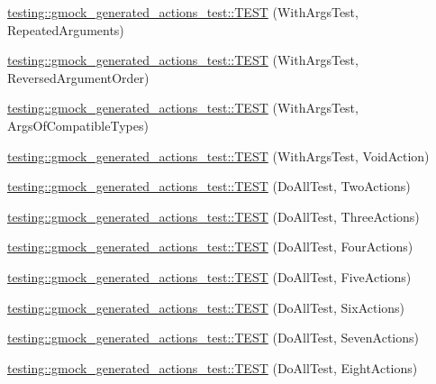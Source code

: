\begin{DoxyCompactItemize}
\item 
\hyperlink{namespacetesting_1_1gmock__generated__actions__test_aea7114a30b1fc589d14e84f1a27bd1fb}{testing\+::gmock\+\_\+generated\+\_\+actions\+\_\+test\+::\+T\+E\+ST} (With\+Args\+Test, Repeated\+Arguments)
\item 
\hyperlink{namespacetesting_1_1gmock__generated__actions__test_a8a9dc47b8e9810ca74166a9d17cba54f}{testing\+::gmock\+\_\+generated\+\_\+actions\+\_\+test\+::\+T\+E\+ST} (With\+Args\+Test, Reversed\+Argument\+Order)
\item 
\hyperlink{namespacetesting_1_1gmock__generated__actions__test_a4330224375c915f21860c30798dacd0c}{testing\+::gmock\+\_\+generated\+\_\+actions\+\_\+test\+::\+T\+E\+ST} (With\+Args\+Test, Args\+Of\+Compatible\+Types)
\item 
\hyperlink{namespacetesting_1_1gmock__generated__actions__test_a744fd048a745e3df48a578ed251003c6}{testing\+::gmock\+\_\+generated\+\_\+actions\+\_\+test\+::\+T\+E\+ST} (With\+Args\+Test, Void\+Action)
\item 
\hyperlink{namespacetesting_1_1gmock__generated__actions__test_ab1820fa999561582ae20885c4149a634}{testing\+::gmock\+\_\+generated\+\_\+actions\+\_\+test\+::\+T\+E\+ST} (Do\+All\+Test, Two\+Actions)
\item 
\hyperlink{namespacetesting_1_1gmock__generated__actions__test_a9fe00b82e3daa39501cefb4636b1909c}{testing\+::gmock\+\_\+generated\+\_\+actions\+\_\+test\+::\+T\+E\+ST} (Do\+All\+Test, Three\+Actions)
\item 
\hyperlink{namespacetesting_1_1gmock__generated__actions__test_aa6ed664752eab81abc0c8ec08bc28fe0}{testing\+::gmock\+\_\+generated\+\_\+actions\+\_\+test\+::\+T\+E\+ST} (Do\+All\+Test, Four\+Actions)
\item 
\hyperlink{namespacetesting_1_1gmock__generated__actions__test_adf15fb74ccf2a473a31f0ae733210f3f}{testing\+::gmock\+\_\+generated\+\_\+actions\+\_\+test\+::\+T\+E\+ST} (Do\+All\+Test, Five\+Actions)
\item 
\hyperlink{namespacetesting_1_1gmock__generated__actions__test_af9328f486c8862bfb3a08bd9c0b10a2d}{testing\+::gmock\+\_\+generated\+\_\+actions\+\_\+test\+::\+T\+E\+ST} (Do\+All\+Test, Six\+Actions)
\item 
\hyperlink{namespacetesting_1_1gmock__generated__actions__test_aa1eb8dae72fb173011bf64027f075cea}{testing\+::gmock\+\_\+generated\+\_\+actions\+\_\+test\+::\+T\+E\+ST} (Do\+All\+Test, Seven\+Actions)
\item 
\hyperlink{namespacetesting_1_1gmock__generated__actions__test_a7e7ffc936de010908f42193b951016e3}{testing\+::gmock\+\_\+generated\+\_\+actions\+\_\+test\+::\+T\+E\+ST} (Do\+All\+Test, Eight\+Actions)

\end{DoxyCompactItemize}
